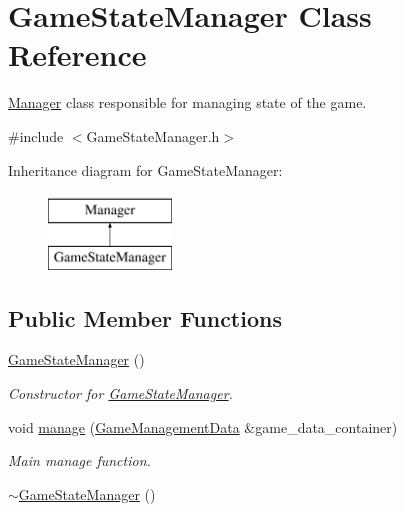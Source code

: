 \hypertarget{classGameStateManager}{\section{Game\-State\-Manager Class Reference}
\label{classGameStateManager}
}


\hyperlink{classManager}{Manager} class responsible for managing state of the game.  




{\ttfamily \#include $<$Game\-State\-Manager.\-h$>$}

Inheritance diagram for Game\-State\-Manager\-:\begin{figure}[H]
\begin{center}
\leavevmode
\includegraphics[height=2.000000cm]{classGameStateManager}
\end{center}
\end{figure}
\subsection*{Public Member Functions}
\begin{DoxyCompactItemize}
\item 
\hyperlink{classGameStateManager_aa9769dca27ad070cf5491a7f54c7d85e}{Game\-State\-Manager} ()
\begin{DoxyCompactList}\small\item\em Constructor for \hyperlink{classGameStateManager}{Game\-State\-Manager}. \end{DoxyCompactList}\item 
void \hyperlink{classGameStateManager_aa113f5c0f62142776ec8cef1bb904ff5}{manage} (\hyperlink{classGameManagementData}{Game\-Management\-Data} \&game\-\_\-data\-\_\-container)
\begin{DoxyCompactList}\small\item\em Main manage function. \end{DoxyCompactList}\item 
\hyperlink{classGameStateManager_ad20961eb5d9ed6b7ef764037d5e11ba5}{$\sim$\-Game\-State\-Manager} ()
\end{DoxyCompactItemize}
